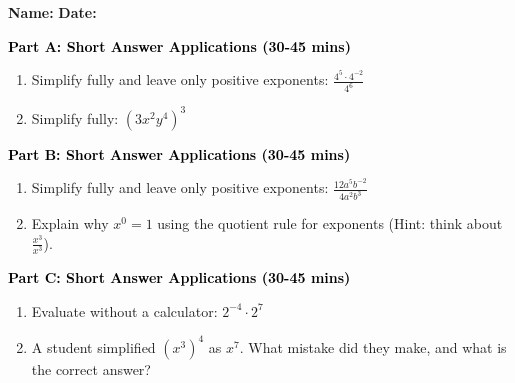 \documentclass[12pt, letterpaper, fleqn]{article}
\begin{document}
\textbf{Name:} \underline{\hspace{5cm}}
\hfill
\textbf{Date:} \underline{\hspace{3cm}}\\


\begin{tcolorbox}[colback=customteal!20]
\large\textcolor{black}{\textbf{Part A: Short Answer Applications (30-45 mins)}}
\end{tcolorbox}

\vspace{3mm}

\begin{enumerate}[itemsep=4.2cm, leftmargin=0.6cm]
\item Simplify fully and leave only positive exponents: $\frac{4^5 \cdot 4^{-2}}{4^6}$
\item Simplify fully: $(3x^2y^4)^3$
\end{enumerate}

\newpage

\begin{tcolorbox}[colback=customteal!20]
\large\textcolor{black}{\textbf{Part B: Short Answer Applications (30-45 mins)}}
\end{tcolorbox}

\vspace{3mm}

\begin{enumerate}[itemsep=4.2cm, leftmargin=0.6cm, resume]
\item Simplify fully and leave only positive exponents: $\frac{12a^5 b^{-2}}{4a^2 b^3}$
\item Explain why $x^0 = 1$ using the quotient rule for exponents (Hint: think about $\frac{x^3}{x^3}$).
\end{enumerate}

\newpage

\begin{tcolorbox}[colback=customteal!20]
\large\textcolor{black}{\textbf{Part C: Short Answer Applications (30-45 mins)}}
\end{tcolorbox}

\vspace{3mm}

\begin{enumerate}[itemsep=4.2cm, leftmargin=0.6cm, resume]
\item Evaluate without a calculator: $2^{-4} \cdot 2^7$
\item A student simplified $(x^3)^4$ as $x^7$. What mistake did they make, and what is the correct answer?
\end{enumerate}
\end{document}
